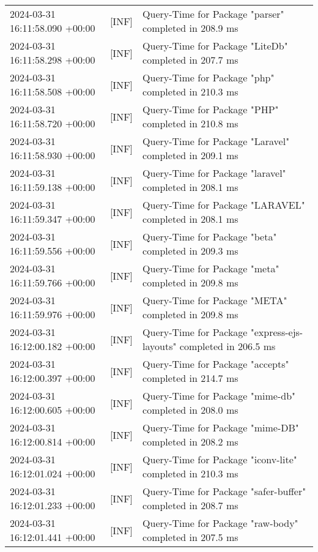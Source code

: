 {{\begin{tabularx}{\textwidth}{|l|l|X|}
                    2024-03-31 16:11:58.090 +00:00 & [INF] & Query-Time for Package "parser" completed in 208.9 ms \\
                    2024-03-31 16:11:58.298 +00:00 & [INF] & Query-Time for Package "LiteDb" completed in 207.7 ms \\
                    2024-03-31 16:11:58.508 +00:00 & [INF] & Query-Time for Package "php" completed in 210.3 ms \\
                    2024-03-31 16:11:58.720 +00:00 & [INF] & Query-Time for Package "PHP" completed in 210.8 ms \\
                    2024-03-31 16:11:58.930 +00:00 & [INF] & Query-Time for Package "Laravel" completed in 209.1 ms \\
                    2024-03-31 16:11:59.138 +00:00 & [INF] & Query-Time for Package "laravel" completed in 208.1 ms \\
                    2024-03-31 16:11:59.347 +00:00 & [INF] & Query-Time for Package "LARAVEL" completed in 208.1 ms \\
                    2024-03-31 16:11:59.556 +00:00 & [INF] & Query-Time for Package "beta" completed in 209.3 ms \\
                    2024-03-31 16:11:59.766 +00:00 & [INF] & Query-Time for Package "meta" completed in 209.8 ms \\
                    2024-03-31 16:11:59.976 +00:00 & [INF] & Query-Time for Package "META" completed in 209.8 ms \\
                    2024-03-31 16:12:00.182 +00:00 & [INF] & Query-Time for Package "express-ejs-layouts" completed in 206.5 ms \\
                    2024-03-31 16:12:00.397 +00:00 & [INF] & Query-Time for Package "accepts" completed in 214.7 ms \\
                    2024-03-31 16:12:00.605 +00:00 & [INF] & Query-Time for Package "mime-db" completed in 208.0 ms \\
                    2024-03-31 16:12:00.814 +00:00 & [INF] & Query-Time for Package "mime-DB" completed in 208.2 ms \\
                    2024-03-31 16:12:01.024 +00:00 & [INF] & Query-Time for Package "iconv-lite" completed in 210.3 ms \\
                    2024-03-31 16:12:01.233 +00:00 & [INF] & Query-Time for Package "safer-buffer" completed in 208.7 ms \\
                    2024-03-31 16:12:01.441 +00:00 & [INF] & Query-Time for Package "raw-body" completed in 207.5 ms \\

\end{tabularx}}}
